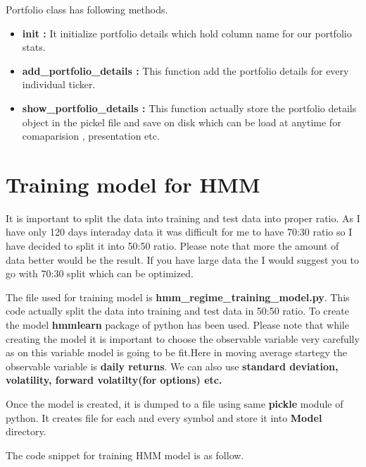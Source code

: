 \documentclass{report}
\begin{document}
Portfolio class has following methods.

\begin{itemize}
  \item \textbf{init :}
  It initialize portfolio details which hold column name for our portfolio stats.
  \item \textbf{add\_portfolio\_details :}
  This function add the portfolio details for every individual ticker.
  \item \textbf{show\_portfolio\_details :}
  This function actually store the portfolio details object in the pickel file and save on disk which can be load at anytime for comaparision , presentation etc.
  

\end{itemize}



\chapter{Training model for HMM}
It is important to split the data into training and test data into proper ratio. As I have only 120 days interaday data it was difficult for me to have 70:30 ratio so I have decided to split it into 50:50 ratio. Please note that more the amount of data better would be the result. If you have large data the I would suggest you to go with 70:30 split which can be optimized.

The file used for training model is \textbf{hmm\_regime\_training\_model.py}.
This code actually split the data into training and test data in 50:50 ratio. To create the model \textbf{hmmlearn} package of python has been used. Please note that while creating the model it is important to choose the observable variable very carefully as on this variable model is going to be fit.Here in moving average startegy the observable variable is \textbf{daily returns}. We can also use \textbf{standard deviation, volatility, forward volatilty(for options) etc.}

Once the model is created, it is dumped to a file using same \textbf{pickle} module of python. It creates file for each and every symbol and store it into \textbf{Model} directory. 

\newpage

The code snippet for training HMM model is as follow.
\end{document}
